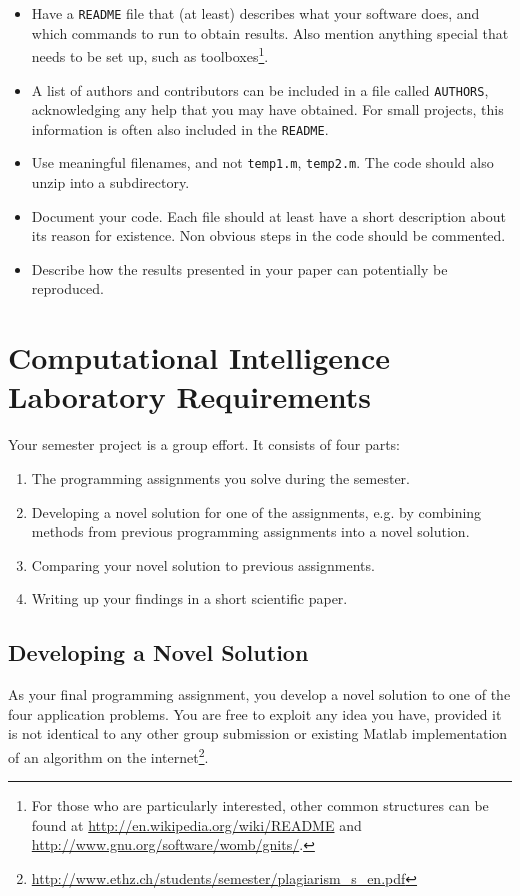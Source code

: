 \documentclass[10pt,conference,compsocconf]{IEEEtran}
\begin{document}
\begin{itemize}
\item Have a \texttt{README} file that (at least) describes what your software does, and which commands to run to obtain results. Also mention anything special that needs to be set up, such as toolboxes\footnote{For those who are particularly interested, other common structures can be found at \url{http://en.wikipedia.org/wiki/README} and \url{http://www.gnu.org/software/womb/gnits/}.}.
\item A list of authors and contributors can be included in a file called \texttt{AUTHORS}, acknowledging any help that you may have obtained. For small projects, this information is often also included in the \texttt{README}.
\item Use meaningful filenames, and not \texttt{temp1.m}, \texttt{temp2.m}. The code should also unzip into a subdirectory.
\item Document your code. Each file should at least have a short description about its reason for existence. Non obvious steps in the code should be commented.
\item Describe how the results presented in your paper can potentially be reproduced.
\end{itemize}


\section{Computational Intelligence Laboratory Requirements}
\label{sec:cil}

Your semester project is a group effort. It consists of four parts:
\begin{enumerate}
\item The programming assignments you solve during the semester.
\item Developing a novel solution for one of the assignments, e.g. by combining methods from previous programming assignments into a novel solution.
\item Comparing your novel solution to previous assignments.
\item Writing up your findings in a short scientific paper.
\end{enumerate}

\subsection{Developing a Novel Solution}

As your final programming assignment, you develop a novel solution to one of the four application problems. You are free to exploit any idea you have, provided it is not identical to any other group submission or existing Matlab implementation of an algorithm on the internet\footnote{\url{http://www.ethz.ch/students/semester/plagiarism_s_en.pdf}}.
\end{document}
